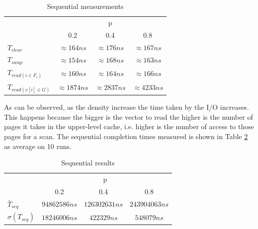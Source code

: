\begin{table}[h]
    \begin{center}
        \begin{tabular}{|| l | c | c | c ||}
            \hline
              & \multicolumn{3}{c||}{p} \\ \cline{2-4}
              & 0.2 & 0.4 & 0.8 \\ \hline \hline
             $T_{clear}$  & $\approx 164ns$& $\approx 176ns$& $\approx 167ns$
             \\ \hline 
             $T_{swap}$  & $\approx 154ns$& $\approx 168ns$& $\approx 163ns$
             \\ \hline 
             $T_{read(i \in F_i)}$  & $\approx 160ns$& $\approx 164ns$& $\approx 166ns$
             \\ \hline 
             $T_{read(v[i] \in G)}$  & $\approx 1874ns$& $\approx 2837ns$& $\approx 4233ns$
             \\ \hline
        \end{tabular}
    \end{center}
    \label{tab:seq-meas}
    \caption{Sequential  measurements}
\end{table}
As can be observed, as the density increase the time taken by the I/O increases. This happens because the bigger is the vector to read the higher is the number of pages it takes in the upper-level cache, i.e. higher is the number of access to those pages for a scan. The sequential completion 
times measured is shown in Table \ref{tab:seq-results} as average on 10 runs.
\begin{table}[!htb]
    \begin{center}
        \begin{tabular}{|| l | c | c | c ||}
            \hline
              & \multicolumn{3}{c||}{p} \\ \cline{2-4}
              & 0.2 & 0.4 & 0.8 \\ \hline \hline
             $\bar{T}_{seq}$ & $94862586ns$ & $126302631ns$ & $243904063ns$ \\ \hline
             $\sigma(T_{seq})$ & $18246006ns$ & $422329ns$ & $548079ns$ \\ \hline
            \hline
        \end{tabular}
    \end{center}
    \label{tab:seq-results}
    \caption{Sequential results}
\end{table}
